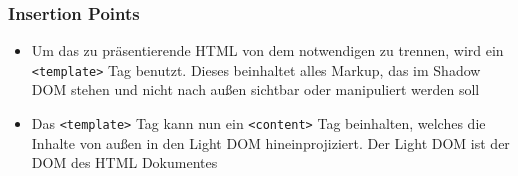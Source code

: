 \subsubsection{Insertion Points}\label{insertion-points}

\begin{itemize}
\tightlist
\item
  Um das zu präsentierende HTML von dem notwendigen zu trennen, wird ein
  \texttt{\textless{}template\textgreater{}} Tag benutzt. Dieses
  beinhaltet alles Markup, das im Shadow DOM stehen und nicht nach außen
  sichtbar oder manipuliert werden soll
\item
  Das \texttt{\textless{}template\textgreater{}} Tag kann nun ein
  \texttt{\textless{}content\textgreater{}} Tag beinhalten, welches die
  Inhalte von außen in den Light DOM hineinprojiziert. Der Light DOM ist
  der DOM des HTML Dokumentes
\end{itemize}

\begin{Shaded}
\begin{Highlighting}[]
\KeywordTok{>}
\KeywordTok{>}
  \KeywordTok{>}
\end{Highlighting}
\end{Shaded}

\begin{Shaded}
\begin{Highlighting}[]
\OperatorTok{<}\OperatorTok{>}
 \OperatorTok{=} \NormalTok{(}\NormalTok{()}\OperatorTok{;}
 \OperatorTok{=} \NormalTok{(}\NormalTok{)}\OperatorTok{;}
 \OperatorTok{=} \NormalTok{(}\OperatorTok{,} \NormalTok{)}\OperatorTok{;}
\OperatorTok{;}
\OperatorTok{<}
\end{Highlighting}
\end{Shaded}

